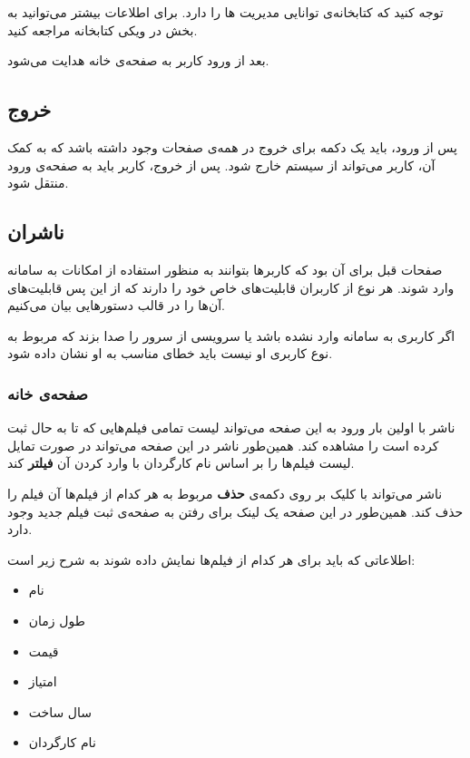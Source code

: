 \documentclass{utap}
\begin{document}
    توجه کنید که کتابخانه‌ی
    توانایی مدیریت
    ها
    را دارد. برای اطلاعات بیشتر می‌توانید به بخش
    \href{https://github.com/UTAP/APHTTP/wiki/Session}{}
    در ویکی کتابخانه مراجعه کنید. 
    
    بعد از ورود کاربر به صفحه‌ی خانه هدایت می‌شود.

    
    \subsection{خروج}
    پس از ورود، باید یک دکمه برای خروج در همه‌ی صفحات وجود داشته باشد که به کمک آن، کاربر می‌تواند از سیستم خارج شود. پس از خروج، کاربر باید به صفحه‌ی ورود منتقل شود.
    
    
    
    \subsection{ناشران}
    صفحات قبل برای آن بود که کاربر‌ها بتوانند به منظور استفاده از امکانات به سامانه‌ وارد شوند. هر نوع از کاربران قابلیت‌های خاص خود  را دارند که از این پس قابلیت‌های آن‌ها را در قالب دستورهایی بیان می‌کنیم.
    
        اگر کاربری به سامانه وارد نشده باشد یا سرویسی از سرور را صدا بزند که مربوط به نوع کاربری او نیست باید خطای مناسب به او نشان داده شود.
        
        \subsubsection{صفحه‌ی خانه} 
        ناشر با اولین بار ورود به این صفحه می‌تواند لیست تمامی فیلم‌هایی که تا به حال ثبت کرده است را مشاهده کند. همین‌طور ناشر در این صفحه می‌تواند در صورت تمایل لیست‌ فیلم‌ها را بر اساس نام کارگردان با وارد کردن آن \textbf{فیلتر} کند. 
        
        
        ناشر می‌تواند با کلیک بر روی دکمه‌ی \textbf{حذف} مربوط به هر کدام از فیلم‌ها آن فیلم را حذف کند. 
        همین‌طور در این صفحه یک لینک برای رفتن به صفحه‌ی ثبت فیلم جدید وجود دارد.
        
        اطلاعاتی که باید برای هر کدام از فیلم‌ها نمایش داده شوند به شرح زیر است:‌
        \begin{multicols}{3}
        \begin{itemize}[noitemsep,nosep]
            \item نام 
            \item طول زمان  
            \item قیمت 
            \item امتیاز 
            \item سال ساخت
            \item نام کارگردان
        \end{itemize}
        \end{multicols}
        
\end{document}
